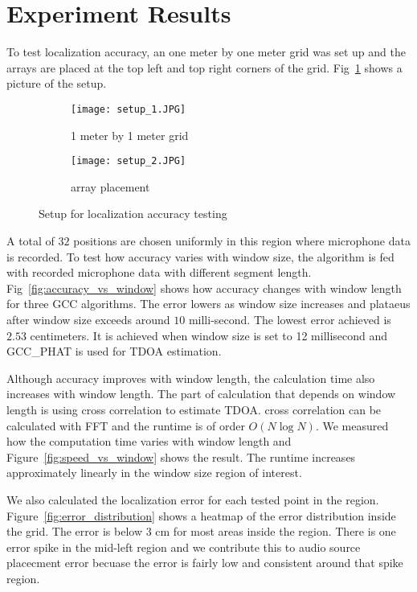 \section{Experiment Results}
To test localization accuracy, an one meter by one meter grid was set up and the arrays are placed at the top left and top right corners of the grid. Fig~\ref{fig:setup_point} shows a picture of the setup. 

\begin{figure}[]
  \centering
  \begin{subfigure}[]{.2\textwidth}
    \texttt{[image: setup\_1.JPG]}
    \caption{1 meter by 1 meter grid}
  \end{subfigure}
  \begin{subfigure}[]{.2\textwidth}
    \texttt{[image: setup\_2.JPG]}
    \caption{array placement}
  \end{subfigure}
  \caption{Setup for localization accuracy testing}
  \label{fig:setup_point}
\end{figure}

A total of $32$ positions are chosen uniformly in this region where microphone data is recorded. To test how accuracy varies with window size, the algorithm is fed with recorded microphone data with different segment length. Fig~\ref{fig:accuracy_vs_window} shows how accuracy changes with window length for three GCC algorithms. The error lowers as window size increases and plataeus after window size exceeds around $10$ milli-second. The lowest error achieved is $2.53$ centimeters. It is achieved when window size is set to 12 millisecond and GCC\_PHAT is used for TDOA estimation.

Although accuracy improves with window length, the calculation time also increases with window length. The part of calculation that depends on window length is using cross correlation to estimate TDOA. cross correlation can be calculated with FFT and the runtime is of order $O(N\log N)$. We measured how the computation time varies with window length and Figure~\ref{fig:speed_vs_window} shows the result. The runtime increases approximately linearly in the window size region of interest.

We also calculated the localization error for each tested point in the region. Figure~\ref{fig:error_distribution} shows a heatmap of the error distribution inside the grid. The error is below $3$ cm for most areas inside the region. There is one error spike in the mid-left region and we contribute this to audio source placecment error becuase the error is fairly low and consistent around that spike region.

